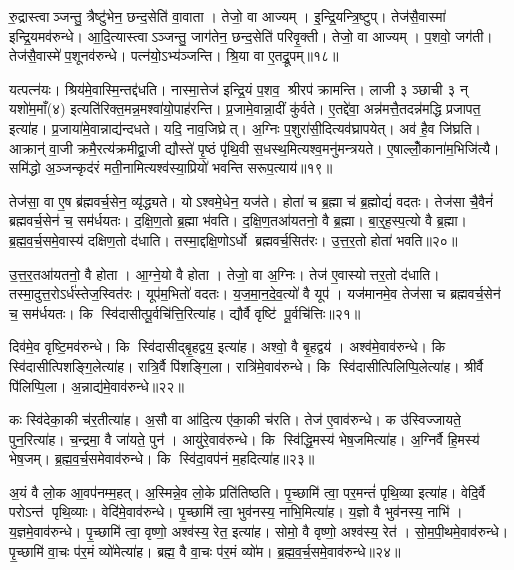 रु॒द्रास्त्वाञ्जन्तु॒ त्रैष्टु॑भेन॒ छन्द॒सेति॑ वा॒वाता। तेजो॒ वा आज्यम्। इ॒न्द्रि॒यन्त्रि॒ष्टुप्। तेज॑सै॒वास्मा॑ इन्द्रि॒यमव॑रुन्धे। आ॒दि॒त्यास्त्वाऽञ्जन्तु॒ जाग॑तेन॒ छन्द॒सेति॑ परिवृ॒क्ती। तेजो॒ वा आज्यम्। प॒शवो॒ जग॑ती। तेज॑सै॒वास्मे॑ प॒शूनव॑रुन्धे। पत्न॑यो॒ऽभ्य॑ञ्जन्ति। श्रि॒या वा ए॒तद्रू॒पम्॥१८॥

यत्पत्न॑यः। श्रिय॑मे॒वास्मि॒न्तद्द॑धति। नास्मा॒त्तेज॑ इन्द्रि॒यं प॒शव॒ श्रीरप॑ क्रामन्ति। लाजी ३ ञ्छाची ३ न् यशो॑म॒माँ(४) इत्यति॑रिक्त॒मन्न॒मश्वा॑यो॒पाह॑रन्ति। प्र॒जामे॒वान्ना॒दीं कु॑र्वते। ए॒तद्दे॑वा॒ अन्न॑मत्तै॒तदन्न॑मद्धि प्रजापत॒ इत्या॑ह। प्र॒जाया॑मे॒वान्नाद्य॑न्दधते। यदि॒ नाव॒जिघ्रेत्। अ॒ग्निः प॒शुरा॑सी॒दित्यव॑घ्रापयेत्। अव॑ है॒व जि॑घ्रति। आक्रान्॑ वा॒जी क्रमै॒रत्य॑क्रमीद्वा॒जी द्यौस्ते॑ पृ॒ष्ठं पृ॑थि॒वी स॒धस्थ॒मित्यश्व॒मनु॑मन्त्रयते। ए॒षाल्लोँ॒काना॑म॒भिजि॑त्यै। समि॑द्धो अ॒ञ्जन्कृद॑रं मती॒नामित्यश्व॑स्या॒प्रियो॑ भवन्ति सरूप॒त्याय॑॥१९॥\anuvakamend[परि॑त॒स्थुष॒ इत्या॑हे॒मे ए॒वास्मै॑ युनक्त्य॒भिजि॑त्यै भरन्त्यश्वमे॒धो रु॑न्धे रू॒पञ्जि॑घ्रति॒ त्रीणि॑ च]

तेज॑सा॒ वा ए॒ष ब्र॑ह्मवर्च॒सेन॒ व्यृ॑द्ध्यते। योऽश्वमे॒धेन॒ यज॑ते। होता॑ च ब्र॒ह्मा च॑ ब्र॒ह्मोद्यं॑ वदतः। तेज॑सा चै॒वैनं॑ ब्रह्मवर्च॒सेन॑ च॒ सम॑र्धयतः। द॒क्षि॒ण॒तो ब्र॒ह्मा भ॑वति। द॒क्षि॒ण॒तआ॑यतनो॒ वै ब्र॒ह्मा। बा॒र्॒ह॒स्प॒त्यो वै ब्र॒ह्मा। ब्र॒ह्म॒व॒र्च॒समे॒वास्य॑ दक्षिण॒तो द॑धाति। तस्मा॒द्दक्षि॒णोऽर्धो ब्रह्मवर्च॒सित॑रः। उ॒त्त॒र॒तो होता॑ भवति॥२०॥

उ॒त्त॒र॒तआ॑यतनो॒ वै होता। आ॒ग्ने॒यो वै होता। तेजो॒ वा अ॒ग्निः। तेज॑ ए॒वास्योत्तर॒तो द॑धाति। तस्मा॒दुत्त॒रोऽर्ध॑स्तेज॒स्वित॑रः। यूप॑म॒भितो॑ वदतः। य॒ज॒मा॒न॒दे॒व॒त्यो॑ वै यूप॑। यज॑मानमे॒व तेज॑सा च ब्रह्मवर्च॒सेन॑ च॒ सम॑र्धयतः। कि स्वि॑दासीत्पू॒र्वचि॑त्ति॒रित्या॑ह। द्यौर्वै वृष्टि॑ पू॒र्वचि॑त्तिः॥२१॥

दिव॑मे॒व वृष्टि॒मव॑रुन्धे। कि स्वि॑दासीद्बृ॒हद्वय॒ इत्या॑ह। अश्वो॒ वै बृ॒हद्वय॑। अश्व॑मे॒वाव॑रुन्धे। कि स्वि॑दासीत्पिशङ्गि॒लेत्या॑ह। रात्रि॒र्वै पि॑शङ्गि॒ला। रात्रि॑मे॒वाव॑रुन्धे। कि स्वि॑दासीत्पिलिप्पि॒लेत्या॑ह। श्रीर्वै पि॑लिप्पि॒ला। अ॒न्नाद्य॑मे॒वाव॑रुन्धे॥२२॥

कः स्वि॑देका॒की च॑र॒तीत्या॑ह। अ॒सौ वा आ॑दि॒त्य ए॑का॒की च॑रति। तेज॑ ए॒वाव॑रुन्धे। क उ॑स्विज्जायते॒ पुन॒रित्या॑ह। च॒न्द्रमा॒ वै जा॑यते॒ पुन॑। आयु॑रे॒वाव॑रुन्धे। कि स्वि॑द्धि॒मस्य॑ भेष॒जमित्या॑ह। अ॒ग्निर्वै हि॒मस्य॑ भेष॒जम्। ब्र॒ह्म॒व॒र्च॒समेवाव॑रुन्धे। कि स्वि॑दा॒वप॑नं म॒हदित्या॑ह॥२३॥

अ॒यं वै लो॒क आ॒वप॑नम्म॒हत्। अ॒स्मिन्ने॒व लो॒के प्रति॑तिष्ठति। पृ॒च्छामि॑ त्वा॒ पर॒मन्तं॑ पृथि॒व्या इत्या॑ह। वेदि॒र्वै परोऽन्त॑ पृथि॒व्याः। वेदि॑मे॒वाव॑रुन्धे। पृ॒च्छामि॑ त्वा॒ भुव॑नस्य॒ नाभि॒मित्या॑ह। य॒ज्ञो वै भुव॑नस्य॒ नाभि॑। य॒ज्ञमे॒वाव॑रुन्धे। पृ॒च्छामि॑ त्वा॒ वृष्णो॒ अश्व॑स्य॒ रेत॒ इत्या॑ह। सोमो॒ वै वृष्णो॒ अश्व॑स्य॒ रेत॑। सो॒म॒पी॒थमे॒वाव॑रुन्धे। पृ॒च्छामि॑ वा॒चः प॑र॒मं व्यो॑मेत्या॑ह। ब्रह्म॒ वै वा॒चः प॑र॒मं व्यो॑म। ब्र॒ह्म॒व॒र्च॒समे॒वाव॑रुन्धे॥२४॥\anuvakamend[होता॑ भवति॒ वै वृष्टि॑ पू॒र्वचि॑त्तिर॒न्नाद्य॑मे॒वाव॑रुन्धे म॒हदित्या॑ह॒ सोमो॒ वै वृष्णो॒ अश्व॑स्य॒ रेत॑श्च॒त्वारि॑ च]

